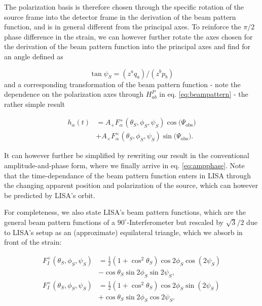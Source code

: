 \documentclass{aa}
\begin{document}
The polarization basis is therefore chosen through the specific rotation of the source frame into the detector frame in the derivation of the beam pattern function, and is in general different from the principal axes. To reinforce the $\pi/2$ phase difference in the strain, we can however further rotate the axes chosen for the derivation of the beam pattern function into the principal axes and find for an angle defined as

\begin{equation}
    \tan \psi_S = (z^aq_a)/(z^bp_b)
\end{equation}
and a corresponding transformation of the beam pattern function - note the dependence on the polarization axes through $H_{ab}^P$ in eq. \ref{eq:beampattern} - the rather simple result

\begin{equation}
\begin{split}
    h_\alpha(t) &=A_+F_{\alpha}^+(\theta_S,\phi_S,\psi_S) \cos \big(\Psi_\mathrm{obs}\big) \\ &+ A_\times F_\alpha^\times (\theta_S,\phi_S,\psi_S) \sin \big(\Psi_\mathrm{obs}\big).
\end{split}
\end{equation}

It can however further be simplified by rewriting our result in the conventional amplitude-and-phase form, where we finally arrive in eq. \ref{eq:ampphase}. Note that the time-dependance of the beam pattern function enters in LISA through the changing apparent position and polarization of the source, which can however be predicted by LISA's orbit.

For completeness, we also state LISA's beam pattern functions, which are the general beam pattern functions of a $90^\circ$-Interferometer but rescaled by $\sqrt{3}/2$ due to LISA's setup as an (approximate) equilateral triangle, which we absorb in front of the strain:

\begin{equation} \label{eq:FLISA}
\begin{split}
    F_I^+ (\theta_S,\phi_S,\psi_S) &=\frac{1}{2}(1+\cos^2\theta_S)\cos 2\phi_S \cos (2\psi_S) \\ &-\cos \theta_S \sin 2\phi_S \sin 2\psi_S, \\
    F_I^\times (\theta_S,\phi_S,\psi_S) &=\frac{1}{2}(1+\cos^2\theta_S)\cos 2\phi_S \sin (2\psi_S) \\ &+\cos \theta_S \sin 2\phi_S \cos 2\psi_S.
\end{split}
\end{equation}
\end{document}
